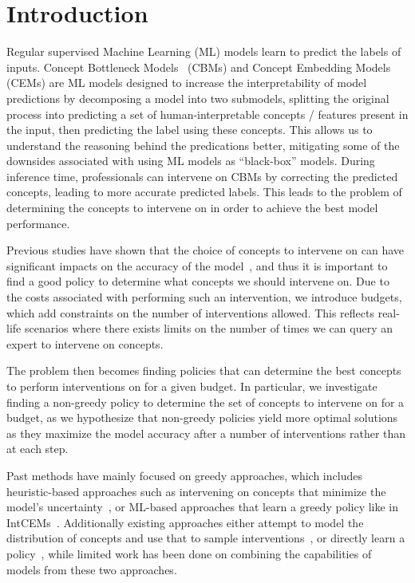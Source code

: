 \documentclass[../main.tex]{subfiles}
\begin{document}
\chapter{Introduction}
\label{firstcontentpage}


Regular supervised Machine Learning (ML) models learn to 
predict the labels of inputs.
Concept Bottleneck Models~\cite{cbm} (CBMs) and Concept Embedding Models~\cite{cem} (CEMs) are 
ML models designed to increase the interpretability of model predictions by decomposing a model into
two submodels, splitting the original process into predicting a set of human-interpretable
concepts / features present in the input, then predicting the label using these concepts.
This allows us to understand the reasoning behind the predications better, 
mitigating some of the downsides associated with using ML models as ``black-box'' models.
During inference time, professionals can intervene on CBMs by correcting
the predicted concepts, leading to more accurate predicted labels. 
This leads to the problem of determining the concepts to intervene on in order
to achieve the best model performance.

Previous studies have shown that the choice of concepts to 
intervene on can have significant impacts on the accuracy of the model~\cite{coop, intcem},
and thus it is important to find a good policy to determine what concepts
we should intervene on.
Due to the costs
associated with performing such an intervention, we introduce budgets,
which add constraints on the number of interventions allowed. 
This
reflects real-life scenarios where
there exists limits on the number of times we 
can query an expert to intervene on concepts.

The problem then becomes finding policies that can determine the best 
concepts to perform interventions on for a given budget. In particular,
we investigate finding a non-greedy policy to determine
the set of concepts to intervene on for a budget,
as we hypothesize that non-greedy policies
yield more optimal solutions as they maximize 
the model accuracy after a number of interventions rather than at each step.

Past methods have mainly focused on greedy approaches, which
includes heuristic-based approaches such as intervening on concepts that minimize the
model's uncertainty~\cite{coop}, or ML-based approaches that learn a greedy policy
like in IntCEMs~\cite{intcem}. Additionally existing approaches either 
attempt to model the distribution of concepts and use that
to sample interventions~\cite{energycem}, 
or directly learn a policy~\cite{intcem}, while limited
work has been done on combining the capabilities of models 
from these two approaches.
\end{document}
